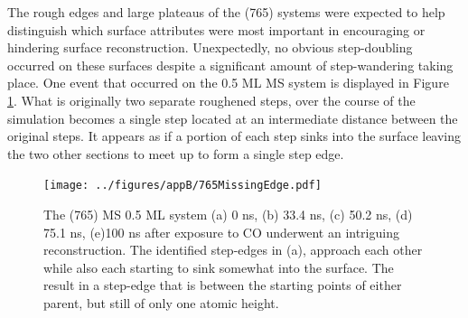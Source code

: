 The rough edges and large plateaus of the (765) systems were expected to help
distinguish which surface attributes were most important in encouraging or
hindering surface reconstruction. Unexpectedly, no obvious step-doubling
occurred on these surfaces despite a significant amount of step-wandering
taking place. One event that occurred on the 0.5 ML MS system is displayed in
Figure \ref{fig:765Edge}. What is originally two separate roughened steps, over
the course of the simulation becomes a single step located at an intermediate
distance between the original steps. It appears as if a portion of each step
sinks into the surface leaving the two other sections to meet up to form a
single step edge.

\begin{landscape}
\begin{figure}
\centering
\texttt{[image: ../figures/appB/765MissingEdge.pdf]}
\caption{The (765) MS 0.5 ML system (a) 0 ns, (b) 33.4 ns, (c) 50.2 ns, (d)
75.1 ns, (e)100 ns after exposure to CO underwent an intriguing reconstruction.
The identified step-edges in (a), approach each other while also each starting
to sink somewhat into the surface. The result in a step-edge that is between
the starting points of either parent, but still of only one atomic height.}
\label{fig:765Edge}
\end{figure}
\end{landscape}
\newpage


